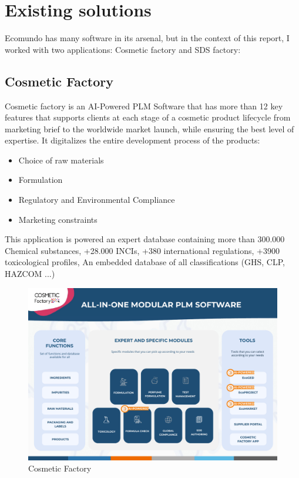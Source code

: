 \documentclass[a4paper,12pt,twoside]{report}
\begin{document}
\section{Existing solutions}
Ecomundo has many software in its arsenal, but in the context of this report, I worked with two applications: Cosmetic factory and SDS factory:
\subsection{Cosmetic Factory}
Cosmetic factory is an AI-Powered PLM Software that has more than 12 key features that supports clients at each stage of a cosmetic product lifecycle from marketing brief to the worldwide market launch, while ensuring the best level of expertise. It digitalizes the entire development process of the products: 
\begin{itemize}
\item Choice of raw materials
\item Formulation
\item Regulatory and Environmental Compliance
\item Marketing constraints
\end{itemize}
This application is powered an expert database containing more than 300.000 Chemical substances, +28.000 INCIs, +380 international regulations, +3900 toxicological profiles, An embedded database of all classifications (GHS, CLP, HAZCOM ...)
\begin{figure}[H]
		\includegraphics[width=\textwidth]{images/cf_ALLinONE}
	\caption[CF All in One]{Cosmetic Factory}
	\label{cfAiO}
\end{figure}
\end{document}
